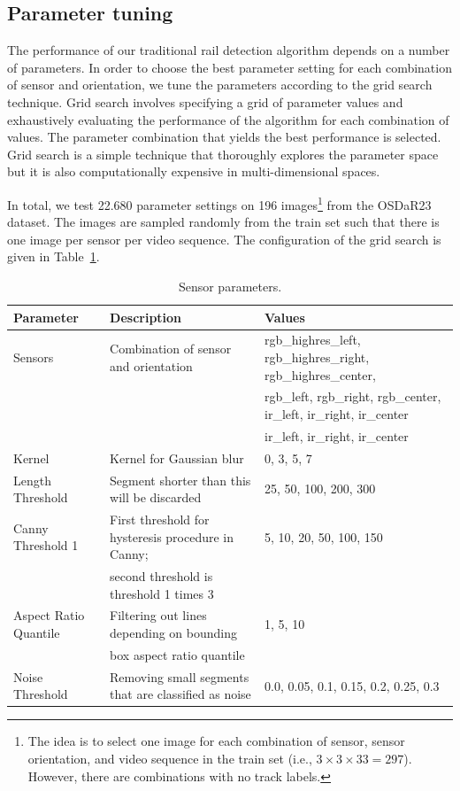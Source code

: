 \documentclass[Master,MDS,english]{BASE/twbook} %
\begin{document}
\subsection{Parameter tuning} \label{sec:fld_parameter}

The performance of our traditional rail detection algorithm depends on a number of parameters. In order to choose the best parameter setting for each combination of sensor and orientation, we tune the parameters according to the grid search technique. Grid search involves specifying a grid of parameter values and exhaustively evaluating the performance of the algorithm for each combination of values. The parameter combination that yields the best performance is selected. Grid search is a simple technique that thoroughly   explores the parameter space but it is also computationally expensive in multi-dimensional spaces.

In total, we test 22.680 parameter settings on 196 images\footnote{The idea is to select one image for each combination of sensor, sensor orientation, and video sequence in the train set (i.e., $3\times3\times33 = 297$). However, there are combinations with no track labels.} from the OSDaR23 dataset. The images are sampled randomly from the train set such that there is one image per sensor per video sequence. The configuration of the grid search is given in Table~\ref{tab:sensor_parameters_fld}.
 
\begin{table}[H]
    \centering
    \tiny
    \begin{tabular}{|l|l|l|}
        \hline
        \textbf{Parameter} & \textbf{Description} & \textbf{Values} \\
        \hline
        Sensors & Combination of sensor and orientation & rgb\_highres\_left, rgb\_highres\_right, rgb\_highres\_center,  \\
                & & rgb\_left, rgb\_right, rgb\_center, ir\_left, ir\_right, ir\_center \\
                 & &  ir\_left, ir\_right, ir\_center \\
        \hline
        Kernel & Kernel for Gaussian blur & 0, 3, 5, 7 \\
        \hline
        Length Threshold & Segment shorter than this will be discarded & 25, 50, 100, 200, 300 \\
        \hline
        Canny Threshold 1 & First threshold for hysteresis procedure in Canny;  & 5, 10, 20, 50, 100, 150 \\
         & second threshold is threshold 1 times 3 &  \\
        \hline
        Aspect Ratio Quantile & Filtering out lines depending on bounding  & 1, 5, 10 \\
          &  box aspect ratio quantile &  \\
        \hline
        Noise Threshold & Removing small segments that are classified as noise & 0.0, 0.05, 0.1, 0.15, 0.2, 0.25, 0.3 \\
        \hline
    \end{tabular}
    \caption{Sensor parameters.}  \label{tab:sensor_parameters_fld}
\end{table}
\end{document}
